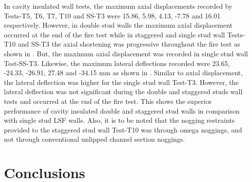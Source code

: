 In cavity insulated wall tests, the maximum axial displacements recorded by Tests-T5, T6, T7, T10 and SS-T3 were 15.86, 5.98, 4.13, -7.78 and 16.01 respectively. However, in double stud walls the maximum axial displacement occurred at the end of the fire test while in staggered and single stud wall Tests-T10 and SS-T3 the axial shortening was progressive throughout the fire test as shown in . But, the maximum axial displacement was recorded in single stud wall Test-SS-T3. Likewise, the maximum lateral deflections recorded were 23.65, -24.33, -26.91, 27.48 and -34.15 mm as shown in . Similar to axial displacement, the lateral deflection was higher for the single stud wall Test-T3. However, the lateral deflection was not significant during the double and staggered studs wall tests and occurred at the end of the fire test. This shows the superior performance of cavity insulated double and staggered stud walls in comparison with single stud LSF walls. Also, it is to be noted that the nogging restraints provided to the staggered stud wall Test-T10 was through omega noggings, and not through conventional unlipped channel section noggings.

\section{Conclusions}


